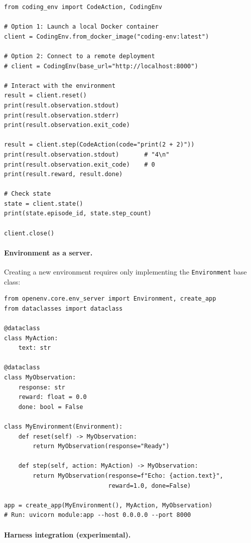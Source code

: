 \begin{lstlisting}[style=pythonstyle]
from coding_env import CodeAction, CodingEnv

# Option 1: Launch a local Docker container
client = CodingEnv.from_docker_image("coding-env:latest")

# Option 2: Connect to a remote deployment
# client = CodingEnv(base_url="http://localhost:8000")

# Interact with the environment
result = client.reset()
print(result.observation.stdout)
print(result.observation.stderr)
print(result.observation.exit_code)

result = client.step(CodeAction(code="print(2 + 2)"))
print(result.observation.stdout)       # "4\n"
print(result.observation.exit_code)    # 0
print(result.reward, result.done)

# Check state
state = client.state()
print(state.episode_id, state.step_count)

client.close()
\end{lstlisting}

\paragraph{Environment as a server.}
\label{environment-as-a-server.}

Creating a new environment requires only implementing the \texttt{Environment} base class:

\begin{lstlisting}[style=pythonstyle]
from openenv.core.env_server import Environment, create_app
from dataclasses import dataclass

@dataclass
class MyAction:
    text: str

@dataclass
class MyObservation:
    response: str
    reward: float = 0.0
    done: bool = False

class MyEnvironment(Environment):
    def reset(self) -> MyObservation:
        return MyObservation(response="Ready")

    def step(self, action: MyAction) -> MyObservation:
        return MyObservation(response=f"Echo: {action.text}",
                             reward=1.0, done=False)

app = create_app(MyEnvironment(), MyAction, MyObservation)
# Run: uvicorn module:app --host 0.0.0.0 --port 8000
\end{lstlisting}

\paragraph{Harness integration (experimental).}
\label{harness-integration-experimental.}

